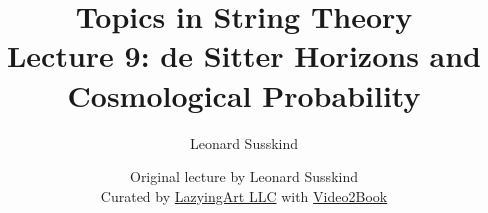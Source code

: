 \documentclass[11pt,oneside]{book}
\begin{document}
\frontmatter
\title{Topics in String Theory\\[0.45em]\large Lecture 9: de Sitter Horizons and Cosmological Probability}
\author{Leonard Susskind}
\date{Original lecture by Leonard Susskind\\[0.35em]Curated by \href{https://lazying.art}{LazyingArt LLC} with \href{https://github.com/lachlanchen/Video2Book}{Video2Book}}
\maketitle
\mainmatter

\end{document}
